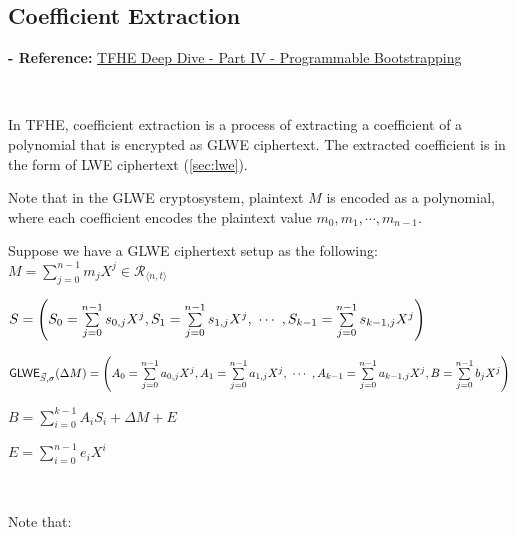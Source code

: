 \subsection{Coefficient Extraction}
\label{subsec:tfhe-extraction}

\textbf{- Reference:} 
\href{https://www.zama.ai/post/tfhe-deep-dive-part-4}{TFHE Deep Dive - Part IV - Programmable Bootstrapping}~\cite{tfhe-4}

$ $

In TFHE, coefficient extraction is a process of extracting a coefficient of a polynomial that is encrypted as GLWE ciphertext. The extracted coefficient is in the form of LWE ciphertext (\autoref{sec:lwe}). %



Note that in the GLWE cryptosystem, plaintext $M$ is encoded as a polynomial, where each coefficient encodes the plaintext value $m_0, m_1, \cdots, m_{n-1}$.


Suppose we have a GLWE ciphertext setup as the following: \\ 
$M = \sum\limits_{j=0}^{n-1}m_jX^j \in \mathcal{R}_{\langle n, t \rangle}$

$S = \left(S_0 = \sum\limits_{j=0}^{n-1}s_{0,j}X^j, S_1 = \sum\limits_{j=0}^{n-1}s_{1,j}X^j, \text{ } \text{$\cdots$} \text{ }, S_{k-1} = \sum\limits_{j=0}^{n-1}s_{k-1,j}X^j \right)$ 

$\textsf{GLWE}_{\vec{S}, \sigma}(\Delta M) = \left(A_0 = \sum\limits_{j=0}^{n-1}a_{0,j}X^j, A_1 = \sum\limits_{j=0}^{n-1}a_{1,j}X^j, \text{ } \text{$\cdots$} \text{ }, A_{k-1} = \sum\limits_{j=0}^{n-1}a_{k-1,j}X^j, B = \sum\limits_{j=0}^{n-1}b_{j}X^j\right)$ 

$B = \sum\limits_{i=0}^{k-1}A_iS_i + \Delta M + E$ 

$E = \sum\limits_{i=0}^{n-1}e_iX^i$ 

$ $

\noindent Note that:

